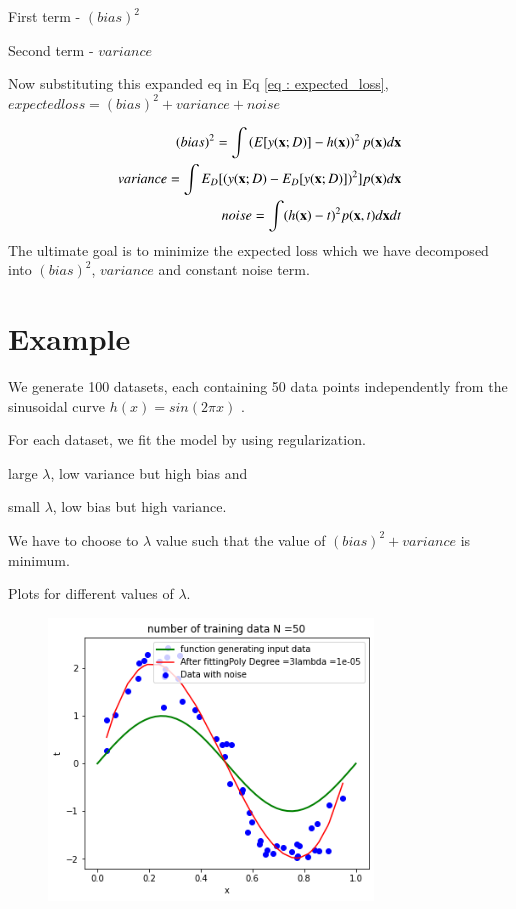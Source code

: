 \documentclass[journal,12pt,twocolumn]{IEEEtran}
\begin{document}
First term -  $(bias)^2$ 

Second term - $variance$ 

Now substituting this expanded eq in Eq \eqref{eq : expected_loss},
$expected loss = (bias)^2 + variance + noise$

\begin{align}
    (bias)^2 = \int \left(E[y(\mathbf{x};D)]- h(\mathbf{x})\right)^2 p(\mathbf{x}) d\mathbf{x}\\
    variance = \int E_{D}[(y(\mathbf{x};D) - E_{D}[y(\mathbf{x};D)])^2] p(\mathbf{x}) d\mathbf{x}\\
    noise = \int(h(\mathbf{x}) - t)^2p(\mathbf{x},t)d\mathbf{x} dt
\end{align}
The ultimate goal is to minimize the expected loss which we have decomposed into $(bias)^2$, $variance$ and constant noise term.

\section{Example}
We generate 100 datasets, each containing 50 data points independently from the sinusoidal curve $h(x) = sin(2\pi x)$ . 

For each dataset, we fit the model by using regularization.

large $\lambda$, low variance but high bias and

small $\lambda$, low bias but high variance.

We have to choose to $\lambda$ value such that the value of $(bias)^2 + variance$ is minimum.

Plots for different values of $\lambda$.

\begin{figure}[!h]
\begin{center}
\includegraphics[width=3.4in]{figs/fig2.png}
\end{center}
\caption{}
\label{fig:2}
\end{figure}
\end{document}
